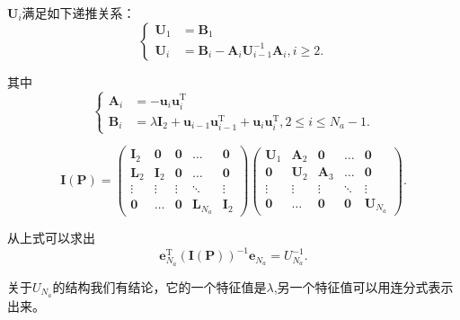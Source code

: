 \documentclass[notheorems,xetex]{beamer}
\theoremstyle{definition}
\begin{document}
\begin{frame}[noframenumbering]
$\bm{U}_i$满足如下递推关系：
\begin{equation*}
\begin{cases}
  \bm{U}_1 &= \bm{B}_1 \\
  \bm{U}_i &= \bm{B}_i-\bm{A}_i\bm{U}_{i-1}^{-1}\bm{A}_i,i\geq 2.
\end{cases}
\end{equation*}

其中
\begin{equation*}
\begin{cases}
  \bm{A}_i &= -\bm{u}_i\bm{u}_i^{\textrm{T}} \\
  \bm{B}_i &=\lambda\bm{I}_2+\bm{u}_{i-1}\bm{u}_{i-1}^{\textrm{T}}+\bm{u}_i\bm{u}_i^{\textrm{T}}, 2 \leq i \leq N_a-1.
\end{cases}
\end{equation*}
\end{frame}
\begin{frame}[noframenumbering]
\begin{equation*}\label{eq:LU}
  \bm{I}(\bm{P})=\begin{pmatrix}
                 \bm{I}_2 & \bm{0} & \bm{0} & \dots & \bm{0} \\
                 \bm{L}_2 & \bm{I}_2 & \bm{0} & \dots & \bm{0} \\
                 \vdots & \vdots & \vdots & \ddots & \vdots \\
                 \bm{0} & \dots & \bm{0} & \bm{L}_{N_a} & \bm{I}_{2}
               \end{pmatrix}\begin{pmatrix}
                 \bm{U}_1 & \bm{A}_2 & \bm{0} & \dots & \bm{0} \\
                 \bm{0} & \bm{U}_2 & \bm{A}_3 & \dots & \bm{0} \\
                 \vdots & \vdots & \vdots & \ddots & \vdots \\
                 \bm{0} & \dots & \bm{0} & \bm{0} & \bm{U}_{N_a}
               \end{pmatrix}.
\end{equation*}

从上式可以求出
\begin{equation*}\label{eq:thomas_final}
\bm{e}_{N_a}^{\textrm{T}}(\bm{I}(\bm{P}))^{-1}\bm{e}_{N_a}=U_{N_a}^{-1}.
\end{equation*}
\pause

关于$U_{N_a}$的结构我们有结论，它的一个特征值是$\lambda$,另一个特征值可以用连分式表示出来。
\end{frame}
\end{document}
